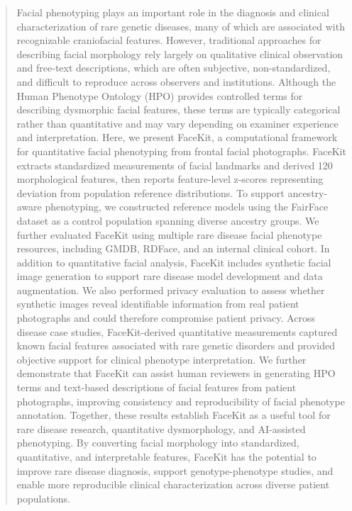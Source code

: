\documentclass[11pt]{article}
\begin{document}
\begin{abstract}
Facial phenotyping plays an important role in the diagnosis and clinical characterization of rare genetic diseases, many of which are associated with recognizable craniofacial features. However, traditional approaches for describing facial morphology rely largely on qualitative clinical observation and free-text descriptions, which are often subjective, non-standardized, and difficult to reproduce across observers and institutions. Although the Human Phenotype Ontology (HPO) provides controlled terms for describing dysmorphic facial features, these terms are typically categorical rather than quantitative and may vary depending on examiner experience and interpretation. Here, we present FaceKit, a computational framework for quantitative facial phenotyping from frontal facial photographs. FaceKit extracts standardized measurements of facial landmarks and derived 120 morphological features, then reports feature-level z-scores representing deviation from population reference distributions. To support ancestry-aware phenotyping, we constructed reference models using the FairFace dataset as a control population spanning diverse ancestry groups. We further evaluated FaceKit using multiple rare disease facial phenotype resources, including GMDB, RDFace, and an internal clinical cohort. In addition to quantitative facial analysis, FaceKit includes synthetic facial image generation to support rare disease model development and data augmentation. We also performed privacy evaluation to assess whether synthetic images reveal identifiable information from real patient photographs and could therefore compromise patient privacy. Across disease case studies, FaceKit-derived quantitative measurements captured known facial features associated with rare genetic disorders and provided objective support for clinical phenotype interpretation. We further demonstrate that FaceKit can assist human reviewers in generating HPO terms and text-based descriptions of facial features from patient photographs, improving consistency and reproducibility of facial phenotype annotation. Together, these results establish FaceKit as a useful tool for rare disease research, quantitative dysmorphology, and AI-assisted phenotyping. By converting facial morphology into standardized, quantitative, and interpretable features, FaceKit has the potential to improve rare disease diagnosis, support genotype-phenotype studies, and enable more reproducible clinical characterization across diverse patient populations.
\end{abstract}
\end{document}
